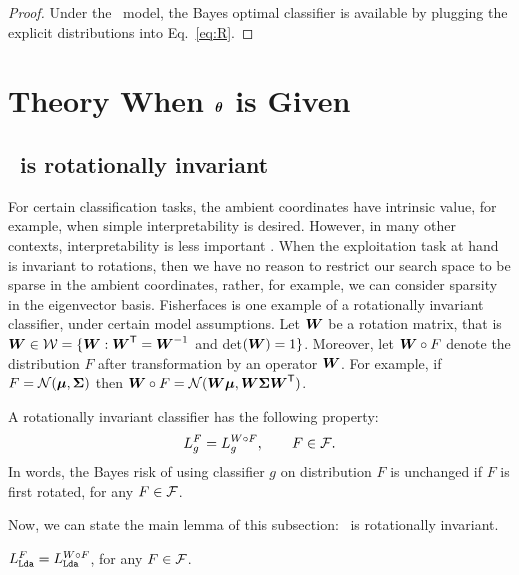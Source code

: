 \documentclass[10pt]{article}
\begin{document}
\begin{proof}
Under the \Lda~model, the Bayes optimal classifier is available by plugging the explicit distributions into Eq.~\eqref{eq:R}.
\end{proof}




\section{Theory When $\boldsymbol{\theta}$ is Given}


\subsection{\Lda~is rotationally invariant}

For certain classification tasks, the ambient coordinates have intrinsic value, for example, when simple interpretability is desired.  However, in many other contexts, interpretability is less important \cite{Breiman2001b}.  When the exploitation task at hand is invariant to rotations, then we have no reason to restrict our search space to be sparse in the ambient coordinates, rather, for example, we can consider sparsity in the eigenvector basis.  Fisherfaces is one example of a rotationally invariant classifier, under certain model assumptions. 
Let  $\boldsymbol{W}$ be a rotation matrix, that is $\boldsymbol{W} \in \mathcal{W}=\{\boldsymbol{W} : \boldsymbol{W}^{\mathsf{T}} = \boldsymbol{W}^{-1}$ and det$(\boldsymbol{W})=1\}$. 
Moreover, let $\boldsymbol{W} \circ F$ denote the distribution $F$ after transformation by an operator $\boldsymbol{W}$.  For example, if $F=\mathcal{N}(\boldsymbol{\mu},\boldsymbol{\Sigma})$ then $\boldsymbol{W} \circ F=\mathcal{N}(\boldsymbol{W}  \boldsymbol{\mu}, \boldsymbol{W} \boldsymbol{\Sigma} \boldsymbol{W}^{\mathsf{T}})$.

\begin{defi}
A rotationally invariant classifier has the following property:
$$L_g^F = L_g^{W \circ F}, \qquad F \in \mathcal{F}.$$
In words, the Bayes risk of using classifier $g$ on distribution $F$ is unchanged if $F$ is first rotated, for any $F \in \mathcal{F}$.
\end{defi}


Now, we can state the main lemma of this subsection:  \Lda~is rotationally invariant.
\begin{lem} \label{lem:rot}
$L_{{\sc \texttt{Lda}}}^F = L_{{\sc \texttt{Lda}}}^{W \circ F}$, for any $F \in \mathcal{F}$.
\end{lem}
\end{document}
